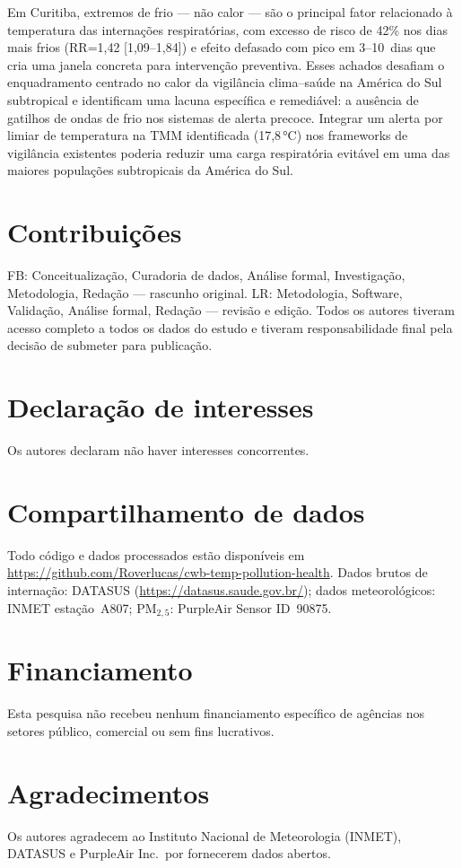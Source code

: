 \documentclass[12pt]{article}
\begin{document}
Em Curitiba, extremos de frio --- não calor --- são o principal fator
relacionado à temperatura das internações respiratórias, com excesso
de risco de 42\% nos dias mais frios (RR=1,42 [1,09--1,84]) e efeito
defasado com pico em 3--10~dias que cria uma janela concreta para
intervenção preventiva. Esses achados desafiam o enquadramento
centrado no calor da vigilância clima--saúde na América do Sul
subtropical e identificam uma lacuna específica e remediável: a
ausência de gatilhos de ondas de frio nos sistemas de alerta precoce.
Integrar um alerta por limiar de temperatura na TMM identificada
(17,8\,°C) nos frameworks de vigilância existentes poderia reduzir
uma carga respiratória evitável em uma das maiores populações
subtropicais da América do Sul.


\section*{Contribuições}
FB: Conceitualização, Curadoria de dados, Análise formal, Investigação,
Metodologia, Redação --- rascunho original. LR: Metodologia, Software,
Validação, Análise formal, Redação --- revisão e edição. Todos os
autores tiveram acesso completo a todos os dados do estudo e tiveram
responsabilidade final pela decisão de submeter para publicação.

\section*{Declaração de interesses}
Os autores declaram não haver interesses concorrentes.

\section*{Compartilhamento de dados}
Todo código e dados processados estão disponíveis em
\url{https://github.com/Roverlucas/cwb-temp-pollution-health}.
Dados brutos de internação: DATASUS
(\url{https://datasus.saude.gov.br/}); dados meteorológicos: INMET
estação~A807; PM$_{2,5}$: PurpleAir Sensor ID~90875.

\section*{Financiamento}
Esta pesquisa não recebeu nenhum financiamento específico de agências
nos setores público, comercial ou sem fins lucrativos.

\section*{Agradecimentos}
Os autores agradecem ao Instituto Nacional de Meteorologia (INMET),
DATASUS e PurpleAir Inc.\ por fornecerem dados abertos.
\end{document}
